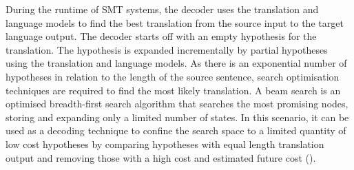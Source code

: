 



During the runtime of \acrshort{SMT} systems, the decoder uses the translation and language models to find the best translation from the source input to the target language output. 
The decoder starts off with an empty hypothesis for the translation. The hypothesis is expanded incrementally by partial hypotheses using the translation and language models. As there is an exponential number of hypotheses in relation to the length of the source sentence, search optimisation techniques are required to find the most likely translation. A beam search is an optimised breadth-first search algorithm that searches the most promising nodes, storing and expanding only a limited number of states. In this scenario, it can be used as a decoding technique to confine the search space to a limited quantity of low cost hypotheses by comparing hypotheses with equal length translation output and removing those with a high cost and estimated future cost (\cite{koehn_pharaoh_2004}).







